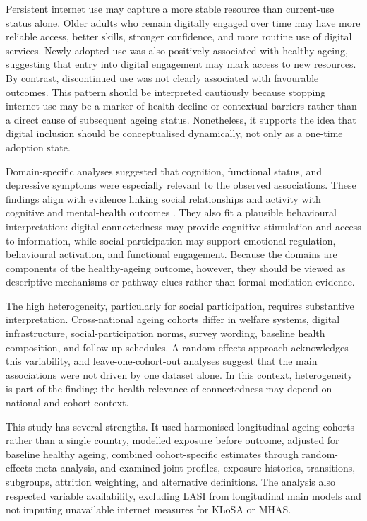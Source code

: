 \documentclass[pdflatex,sn-nature]{sn-jnl}
\begin{document}
Persistent internet use may capture a more stable resource than current-use status alone. Older adults who remain digitally engaged over time may have more reliable access, better skills, stronger confidence, and more routine use of digital services. Newly adopted use was also positively associated with healthy ageing, suggesting that entry into digital engagement may mark access to new resources. By contrast, discontinued use was not clearly associated with favourable outcomes. This pattern should be interpreted cautiously because stopping internet use may be a marker of health decline or contextual barriers rather than a direct cause of subsequent ageing status. Nonetheless, it supports the idea that digital inclusion should be conceptualised dynamically, not only as a one-time adoption state.

Domain-specific analyses suggested that cognition, functional status, and depressive symptoms were especially relevant to the observed associations. These findings align with evidence linking social relationships and activity with cognitive and mental-health outcomes \cite{livingston2024dementia,floud2021cognitive,samtani2022associations,wang2024associations}. They also fit a plausible behavioural interpretation: digital connectedness may provide cognitive stimulation and access to information, while social participation may support emotional regulation, behavioural activation, and functional engagement. Because the domains are components of the healthy-ageing outcome, however, they should be viewed as descriptive mechanisms or pathway clues rather than formal mediation evidence.

The high heterogeneity, particularly for social participation, requires substantive interpretation. Cross-national ageing cohorts differ in welfare systems, digital infrastructure, social-participation norms, survey wording, baseline health composition, and follow-up schedules. A random-effects approach acknowledges this variability, and leave-one-cohort-out analyses suggest that the main associations were not driven by one dataset alone. In this context, heterogeneity is part of the finding: the health relevance of connectedness may depend on national and cohort context.

This study has several strengths. It used harmonised longitudinal ageing cohorts rather than a single country, modelled exposure before outcome, adjusted for baseline healthy ageing, combined cohort-specific estimates through random-effects meta-analysis, and examined joint profiles, exposure histories, transitions, subgroups, attrition weighting, and alternative definitions. The analysis also respected variable availability, excluding LASI from longitudinal main models and not imputing unavailable internet measures for KLoSA or MHAS.
\end{document}
